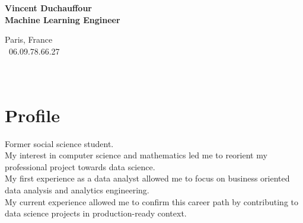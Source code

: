 \documentclass[a4paper,10pt]{article}
\begin{document}
\thispagestyle{empty}


\begin{adjustbox}{valign=t}
    \begin{minipage}{0.3\textwidth}
        \begin{center}
            {\Large \bfseries Vincent Duchauffour}\\
            {\large \bfseries Machine Learning Engineer}\\[1cm]
            \raggedright
            Paris, France\\
            \phone~06.09.78.66.27\\
            \textcolor{ColorTwo}{\faEnvelopeO}
             \\
            \textcolor{ColorTwo}{\faChain}
            \\
            \textcolor{ColorTwo}{\faChain}
        \end{center}
        \vspace{-.5cm}
        \section*{Profile}
        \justifying Former social science student.\\
        My interest in computer science and mathematics led me to reorient my professional project towards data science.\\
        My first experience as a data analyst allowed me to focus on business oriented data analysis and analytics engineering.\\
        My current experience allowed me to confirm this career path by contributing to data science projects in production-ready context.
        \vspace{-.5cm}

\end{minipage}
\end{adjustbox}
\end{document}
